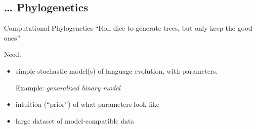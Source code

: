 \documentclass[9pt]{beamer}
\begin{document}
\subsection{… Phylogenetics}
\begin{frame}{Computational Phylogenetics}
  “Roll dice to generate trees, but only keep the good ones”

  \pause
  Need:
  \begin{itemize}
  \item simple stochastic model(s) of language evolution, with parameters.

  Example: \emph{generalized binary model}

  \item intuition (“prior”) of what parameters look like
  \item large dataset of model-compatible data
  \end{itemize}

\end{frame}
\end{document}

